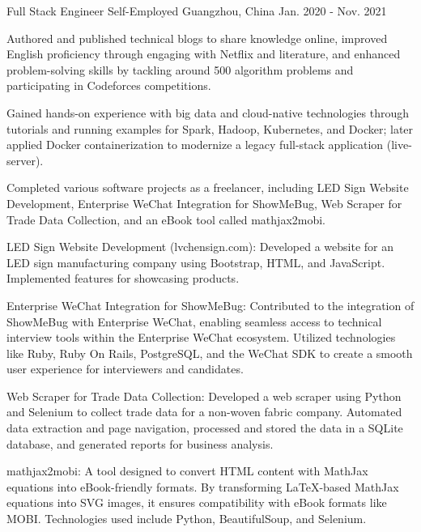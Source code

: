 \begin{cventries}
\cventry
{Full Stack Engineer} %
{Self-Employed} %
{Guangzhou, China} %
{Jan. 2020 - Nov. 2021} %
{
  \begin{cvitems} %
    \item {Authored and published technical blogs to share knowledge online, improved English proficiency through engaging with Netflix and literature, and enhanced problem-solving skills by tackling around 500 algorithm problems and participating in Codeforces competitions.}
    \item {Gained hands-on experience with big data and cloud-native technologies through tutorials and running examples for Spark, Hadoop, Kubernetes, and Docker; later applied Docker containerization to modernize a legacy full-stack application (live-server).}
    \item {Completed various software projects as a freelancer, including LED Sign Website Development, Enterprise WeChat Integration for ShowMeBug, Web Scraper for Trade Data Collection, and an eBook tool called mathjax2mobi.}
    \item {LED Sign Website Development (lvchensign.com): Developed a website for an LED sign manufacturing company using Bootstrap, HTML, and JavaScript. Implemented features for showcasing products.}
    \item {Enterprise WeChat Integration for ShowMeBug: Contributed to the integration of ShowMeBug with Enterprise WeChat, enabling seamless access to technical interview tools within the Enterprise WeChat ecosystem. Utilized technologies like Ruby, Ruby On Rails, PostgreSQL, and the WeChat SDK to create a smooth user experience for interviewers and candidates.}
    \item {Web Scraper for Trade Data Collection: Developed a web scraper using Python and Selenium to collect trade data for a non-woven fabric company. Automated data extraction and page navigation, processed and stored the data in a SQLite database, and generated reports for business analysis.}
    \item {mathjax2mobi: A tool designed to convert HTML content with MathJax equations into eBook-friendly formats. By transforming LaTeX-based MathJax equations into SVG images, it ensures compatibility with eBook formats like MOBI. Technologies used include Python, BeautifulSoup, and Selenium.}
  \end{cvitems}
}


\end{cventries}
